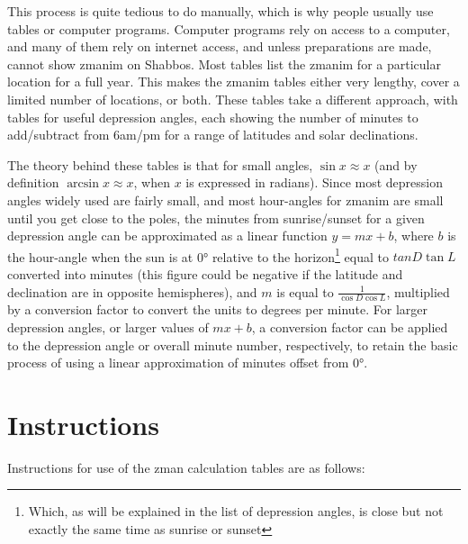 This process is quite tedious to do manually, which is why people usually use tables or computer programs.  Computer programs rely on access to a computer, and many of them rely on internet access, and unless preparations are made, cannot show zmanim on Shabbos.  Most tables list the zmanim for a particular location for a full year.  This makes the zmanim tables either very lengthy, cover a limited number of locations, or both.  These tables take a different approach, with tables for useful depression angles, each showing the number of minutes to add/subtract from 6am/pm for a range of latitudes and solar declinations.

The theory behind these tables is that for small angles, $\sin{x} \approx x$ (and by definition $\arcsin{x} \approx x$, when $x$ is expressed in radians).  Since most depression angles widely used are fairly small, and most hour-angles for zmanim are small until you get close to the poles, the minutes from sunrise/sunset for a given depression angle can be approximated as a linear function $y = mx + b$, where $b$ is the hour-angle when the sun is at 0° relative to the horizon\footnote{Which, as will be explained in the list of depression angles, is close but not exactly the same time as sunrise or sunset} equal to $tan{D}\tan{L}$ converted into minutes (this figure could be negative if the latitude and declination are in opposite hemispheres), and $m$ is equal to $\frac{1}{\cos{D}\cos{L}}$, multiplied by a conversion factor to convert the units to degrees per minute.  For larger depression angles, or larger values of $mx + b$, a conversion factor can be applied to the depression angle or overall minute number, respectively, to retain the basic process of using a linear approximation of minutes offset from 0°.

\section{Instructions}

Instructions for use of the zman calculation tables are as follows:


